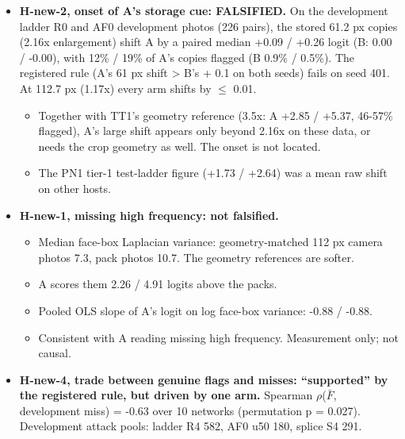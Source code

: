 \documentclass[10pt,twocolumn,letterpaper]{article}
\providecommand{\tightlist}{\setlength{\itemsep}{0pt}\setlength{\parskip}{0pt}}
\begin{document}
\begin{itemize}
\tightlist
\item
  \textbf{H-new-2, onset of A's storage cue: FALSIFIED.} On the development ladder R0 and AF0 development photos (226 pairs), the stored 61.2 px copies (2.16x enlargement) shift A by a paired median +0.09 / +0.26 logit (B: 0.00 / -0.00), with 12\% / 19\% of A's copies flagged (B 0.9\% / 0.5\%). The registered rule (A's 61 px shift \textgreater{} B's + 0.1 on both seeds) fails on seed 401. At 112.7 px (1.17x) every arm shifts by \(\le\) 0.01.

  \begin{itemize}
  \tightlist
  \item
    Together with TT1's geometry reference (3.5x: A +2.85 / +5.37, 46-57\% flagged), A's large shift appears only beyond 2.16x on these data, or needs the crop geometry as well. The onset is not located.
  \item
    The PN1 tier-1 test-ladder figure (+1.73 / +2.64) was a mean raw shift on other hosts.
  \end{itemize}
\item
  \textbf{H-new-1, missing high frequency: not falsified.}

  \begin{itemize}
  \tightlist
  \item
    Median face-box Laplacian variance: geometry-matched 112 px camera photos 7.3, pack photos 10.7. The geometry references are softer.
  \item
    A scores them 2.26 / 4.91 logits above the packs.
  \item
    Pooled OLS slope of A's logit on log face-box variance: -0.88 / -0.88.
  \item
    Consistent with A reading missing high frequency. Measurement only; not causal.
  \end{itemize}
\item
  \textbf{H-new-4, trade between genuine flags and misses: ``supported'' by the registered rule, but driven by one arm.} Spearman \(\rho\)(\(\bar F\), development miss) = -0.63 over 10 networks (permutation p = 0.027). Development attack pools: ladder R4 582, AF0 u50 180, splice S4 291.


\end{itemize}
\end{document}
